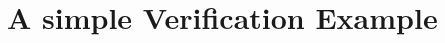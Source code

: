 \documentclass[10pt, conference, compsocconf]{IEEEtran}
\begin{document}
%
%


%




\section{A simple Verification Example}
\end{document}
